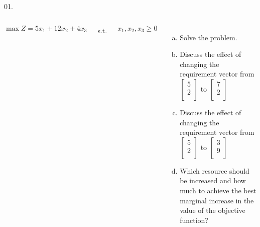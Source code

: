 \begin{frameExample}{01.}{}

  \begin{columns}
      $\max Z = 5x_1 + 12x_2 + 4x_3$

      \vspace{5mm}

      s.t.

  \vspace{5mm}
  
  $x_1 , x_2, x_3 \geq 0$
  \begin{enumerate}[a)] \justifying \parskip4mm
  \item Solve the problem.
  \item Discuss the effect of changing the requirement vector from $%
    \begin{bmatrix}
      5\\
      2\\
    \end{bmatrix}
    $%
    to%
    $
    \begin{bmatrix}
      7\\
      2\\
    \end{bmatrix}
$
\item Discuss the effect of changing the requirement vector from %
  $
  \begin{bmatrix}
    5\\2\\
  \end{bmatrix}
  $
  to%
  $
  \begin{bmatrix}
    3\\9\\
  \end{bmatrix}
  $
  \item Which resource should be increased and how much to achieve the best marginal increase in the value of the objective function?
  \end{enumerate}
  \end{columns}
\end{frameExample}


